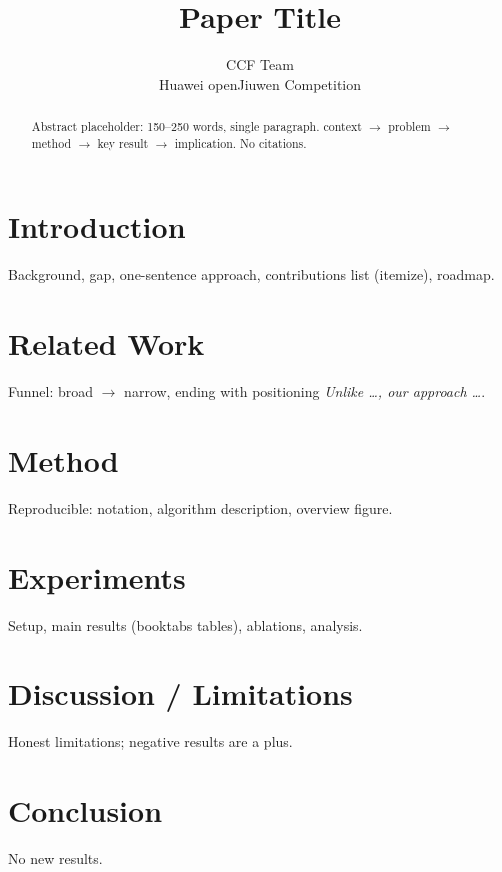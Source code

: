 \documentclass[10pt,twocolumn]{article}
\title{Paper Title}
\author{CCF Team\\ Huawei openJiuwen Competition}
\date{}
\begin{document}
\maketitle

\begin{abstract}
Abstract placeholder: 150--250 words, single paragraph. context $\rightarrow$ problem $\rightarrow$ method $\rightarrow$ key result $\rightarrow$ implication. No citations.
\end{abstract}

\section{Introduction}
Background, gap, one-sentence approach, contributions list (itemize), roadmap.

\section{Related Work}
Funnel: broad $\rightarrow$ narrow, ending with positioning \emph{Unlike \ldots, our approach \ldots}.

\section{Method}
Reproducible: notation, algorithm description, overview figure.

\section{Experiments}
Setup, main results (booktabs tables), ablations, analysis.

\section{Discussion / Limitations}
Honest limitations; negative results are a plus.

\section{Conclusion}
No new results.



\end{document}
